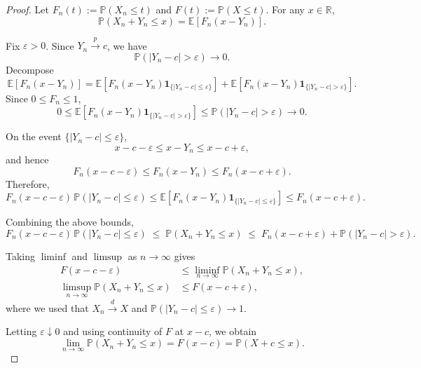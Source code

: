 \documentclass[11pt]{article}
\theoremstyle{definition}
\begin{document}
\begin{proof}
Let $F_n(t) := \mathbb{P}(X_n \le t)$ and $F(t) := \mathbb{P}(X \le t)$.  
For any $x \in \mathbb{R}$,
\[
\mathbb{P}(X_n + Y_n \le x)
= \mathbb{E}\!\left[ F_n(x - Y_n) \right].
\]

Fix $\varepsilon > 0$. Since $Y_n \xrightarrow{p} c$, we have
\[
\mathbb{P}(|Y_n - c| > \varepsilon) \to 0.
\]
Decompose
\[
\mathbb{E}[F_n(x - Y_n)]
= \mathbb{E}\!\left[ F_n(x - Y_n)\mathbf{1}_{\{|Y_n - c|\le \varepsilon\}} \right]
+ \mathbb{E}\!\left[ F_n(x - Y_n)\mathbf{1}_{\{|Y_n - c|> \varepsilon\}} \right].
\]
Since $0 \le F_n \le 1$,
\[
0 \le 
\mathbb{E}\!\left[ F_n(x - Y_n)\mathbf{1}_{\{|Y_n - c|> \varepsilon\}} \right]
\le \mathbb{P}(|Y_n - c| > \varepsilon) \to 0.
\]

On the event $\{|Y_n - c|\le \varepsilon\}$,
\[
x - c - \varepsilon \le x - Y_n \le x - c + \varepsilon,
\]
and hence
\[
F_n(x - c - \varepsilon)
\le F_n(x - Y_n)
\le F_n(x - c + \varepsilon).
\]
Therefore,
\[
F_n(x - c - \varepsilon)\, \mathbb{P}(|Y_n - c|\le \varepsilon)
\le
\mathbb{E}\!\left[ F_n(x - Y_n)\mathbf{1}_{\{|Y_n - c|\le \varepsilon\}} \right]
\le
F_n(x - c + \varepsilon).
\]

Combining the above bounds,
\[
F_n(x - c - \varepsilon)\, \mathbb{P}(|Y_n - c|\le \varepsilon)
\;\le\;
\mathbb{P}(X_n + Y_n \le x)
\;\le\;
F_n(x - c + \varepsilon)
+ \mathbb{P}(|Y_n - c|> \varepsilon).
\]

Taking $\liminf$ and $\limsup$ as $n \to \infty$ gives
\begin{align*}
F(x - c - \varepsilon)
&\le
\liminf_{n\to\infty} \mathbb{P}(X_n + Y_n \le x), \\
\limsup_{n\to\infty} \mathbb{P}(X_n + Y_n \le x)
&\le
F(x - c + \varepsilon),
\end{align*}
where we used that $X_n \xrightarrow{d} X$ and
$\mathbb{P}(|Y_n - c| \le \varepsilon) \to 1$.

Letting $\varepsilon \downarrow 0$ and using continuity of $F$ at $x-c$, we obtain
\[
\lim_{n\to\infty} \mathbb{P}(X_n + Y_n \le x)
= F(x - c)
= \mathbb{P}(X + c \le x).
\]
\end{proof}
\end{document}

